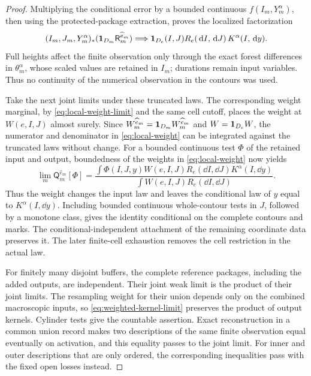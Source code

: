 \begin{proof}
Multiplying the conditional error by a bounded continuous
\(f(I_m,Y_m^\alpha)\), then using the protected-package extraction,
proves the localized factorization
\begin{equation}
 (I_m,J_m,Y_m^\alpha)_*
   (\mathbf 1_{D_m}\mathsf R_m^{\widehat e_m})
   \Longrightarrow
   \mathbf 1_{D_e}(I,J)R_e(\,\mathrm d I,\,\mathrm d J)\,K^\alpha(I,\,\mathrm d y).
 \label{eq:reference-disintegration}
\end{equation}
Full heights affect the finite observation only through the exact forest
differences in \(\theta_m^\alpha\), whose scaled values are retained in
\(I_m\); durations remain input variables.  Thus no continuity of the
numerical observation in the contours was used.

Take the next joint limits under these truncated laws.  The corresponding
weight marginal, by \eqref{eq:local-weight-limit} and the same cell
cutoff, places the weight at \(W(e,I,J)\) almost surely.  Since
\(W_m^{\widehat e_m}=\mathbf 1_{D_m}W_m^{\widehat e_m}\) and
\(W=\mathbf 1_{D_e}W\), the numerator and denominator in
\eqref{eq:local-weight} can be integrated against the truncated laws
without change.
For a bounded continuous test \(\Phi\) of the retained input and output,
boundedness of the weights in \eqref{eq:local-weight} now yields
\begin{equation}
 \lim_m\mathsf Q_m^{\widehat e_m}[\Phi]
 =
 \frac{\displaystyle
   \int \Phi(I,J,y)W(e,I,J)
          R_e(\dd I,\dd J)K^\alpha(I,\dd y)}
      {\displaystyle\int W(e,I,J)R_e(\dd I,\dd J)} .
 \label{eq:weighted-kernel-limit}
\end{equation}
Thus the weight changes the input law and leaves the conditional law
of \(y\) equal to \(K^\alpha(I,\dd y)\).  Including bounded
continuous whole-contour tests in \(J\), followed by a monotone class,
gives the identity conditional on the complete contours and marks.
The conditional-independent attachment of the remaining coordinate
data preserves it.  The later finite-cell exhaustion removes the cell
restriction in the actual law.

For finitely many disjoint buffers, the complete reference packages,
including the added outputs, are independent.  Their joint weak limit
is the product of their joint limits.  The resampling weight for their
union depends only on the combined macroscopic inputs, so
\eqref{eq:weighted-kernel-limit} preserves the product of output
kernels.  Cylinder tests give the countable assertion.  Exact
reconstruction in a common union record makes two descriptions of the
same finite observation equal eventually on activation, and this
equality passes to the joint limit.  For inner and outer descriptions
that are only ordered, the corresponding inequalities pass with the
fixed open losses instead.


\end{proof}
